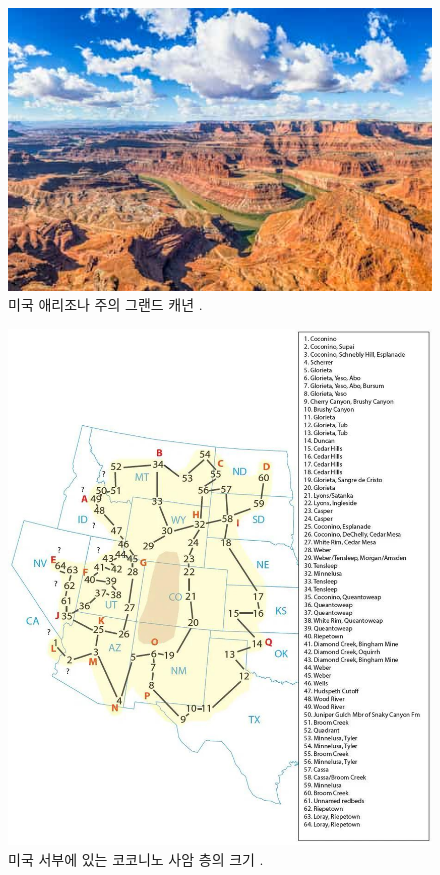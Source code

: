 \documentclass[10pt,twocolumn,letterpaper]{article}
\begin{document}
\begin{figure}[t]
\begin{center}
   \includegraphics[width=1\linewidth]{grand-canyon.jpg}
\end{center}
   \caption{미국 애리조나 주의 그랜드 캐년 \cite{49}.}
\label{fig:2}
\label{fig:onecol}
\end{figure}

\begin{figure}[t]
\begin{center}
   \includegraphics[width=1\linewidth]{coconino.jpg}
\end{center}
   \caption{미국 서부에 있는 코코니노 사암 층의 크기 \cite{21}.}
\label{fig:3}
\label{fig:onecol}
\end{figure}
\end{document}
